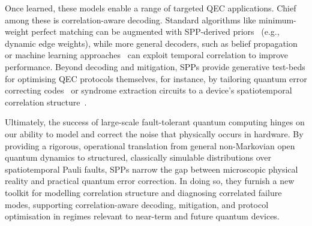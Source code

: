 Once learned, these models enable a range of targeted QEC applications. Chief among these is correlation-aware decoding. Standard algorithms like minimum-weight perfect matching can be augmented with SPP-derived priors~\cite{sivakOptimizationDecoderPriors2024} (e.g., dynamic edge weights), while more general decoders, such as belief propagation~\cite{panteleevDegenerateQuantumLDPC2021} or machine learning approaches~\cite{gicevScalableFastArtificial2023,bauschLearningHighaccuracyError2024,gicevFullyConvolutional3D2025} can exploit temporal correlation to improve performance. 
Beyond decoding and mitigation, SPPs provide generative test-beds for optimising QEC protocols themselves, for instance, by tailoring quantum error correcting codes~\cite{tanggaraStrategicCodeUnified2024} or syndrome extraction circuits to a device's spatiotemporal correlation structure~\cite{mcewenRelaxingHardwareRequirements2023}.

Ultimately, the success of large-scale fault-tolerant quantum computing hinges on our ability to model and correct the noise that physically occurs in hardware. By providing a rigorous, operational translation from general non-Markovian open quantum dynamics to structured, classically simulable distributions over spatiotemporal Pauli faults, SPPs narrow the gap between microscopic physical reality and practical quantum error correction. In doing so, they furnish a new toolkit for modelling correlation structure and diagnosing correlated failure modes, supporting correlation-aware decoding, mitigation, and protocol optimisation in regimes relevant to near-term and future quantum devices.